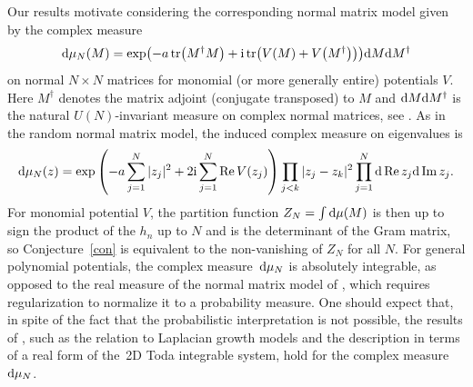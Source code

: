 \documentclass[10pt,a4paper]{amsart}
\numberwithin{equation}{section}
\theoremstyle{definition}
\begin{document}
Our results motivate considering the corresponding normal matrix model given by the complex measure
\[
 {\rm d}\mu_N(M)=\exp\bigl(-a\operatorname{tr}\bigl(M^\dagger M\bigr)+{\rm i}\operatorname{tr}\bigl(V(M)+V\bigl(M^\dagger\bigr)\bigr)\bigr){\rm d}M{\rm d}M^\dagger
\]
on normal $N\times N$ matrices for monomial (or more generally entire) potentials $V$. Here $M^\dagger$ denotes the matrix adjoint (conjugate transposed) to $M$ and ${\rm d}M{\rm d}M^\dagger$ is the natural $U(N)$-invariant measure on complex normal matrices, see \cite{ElbauFelder2005,WiegmannZabrodin2000}.
As in the random normal matrix model, the induced complex measure on eigenvalues is
\[
 {\rm d}\mu_N(z)=\exp\left(-a\sum_{j=1}^N|z_j|^2+2{\rm i}\sum_{j=1}^N\operatorname{Re} V(z_j)\right)\prod_{j<k}|z_j-z_k|^2\prod_{j=1}^N
 {\rm d}\operatorname{Re}z_j{\rm d}\operatorname{Im} z_j.
\]
For monomial potential $V$, the partition function $Z_N=\int{\rm d}\mu(M)$ is then up to sign the product of the $h_n$ up to $N$ and is the determinant of the Gram matrix, so Conjecture~\ref{con} is equivalent to the non-vanishing of $Z_N$ for all $N$.
For general polynomial potentials, the complex measure~${\rm d}\mu_N$ is absolutely integrable, as opposed to the real measure
of the normal matrix model of \cite{WiegmannZabrodin2000}, which requires regularization \cite{BleherKuijlaars2012,ElbauFelder2005} to normalize it to a probability measure.
One should expect that, in spite of the fact that the probabilistic interpretation
is not possible, the results of \cite{WiegmannZabrodin2000}, such as the relation to Laplacian growth models and
the description in terms of a real form of the~2D Toda integrable system, hold for the complex measure ${\rm d}\mu_N$.
\end{document}
